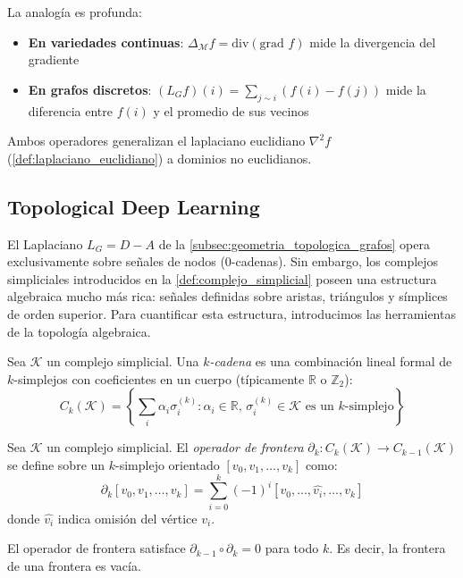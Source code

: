 La analogía es profunda:
\begin{itemize}
	\item \textbf{En variedades continuas}: $\Delta_\mathcal{M} f = \text{div}(\text{grad } f)$ mide la divergencia del gradiente
	\item \textbf{En grafos discretos}: $(L_G f)(i) = \sum_{j \sim i} (f(i) - f(j))$ mide la diferencia entre $f(i)$ y el promedio de sus vecinos
\end{itemize}

Ambos operadores generalizan el laplaciano euclidiano $\nabla^2 f$ (\autoref{def:laplaciano_euclidiano}) a dominios no euclidianos.

\subsection{Topological Deep Learning}\label{subsec:tdl_grafos}

El Laplaciano $L_G = D - A$ de la \autoref{subsec:geometria_topologica_grafos} opera exclusivamente sobre señales de nodos (0-cadenas). Sin embargo, los complejos simpliciales introducidos en la \autoref{def:complejo_simplicial} poseen una estructura algebraica mucho más rica: señales definidas sobre aristas, triángulos y símplices de orden superior. Para cuantificar esta estructura, introducimos las herramientas de la topología algebraica.

\begin{definition}[Cadenas]\label{def:cadenas_gdl}
	Sea $\mathcal{K}$ un complejo simplicial. Una \textit{$k$-cadena} es una combinación lineal formal de $k$-simplejos con coeficientes en un cuerpo (típicamente $\mathbb{R}$ o $\mathbb{Z}_2$):
	\[
		C_k(\mathcal{K}) = \left\{ \sum_{i} \alpha_i \sigma_i^{(k)} : \alpha_i \in \mathbb{R}, \, \sigma_i^{(k)} \in \mathcal{K} \text{ es un } k\text{-simplejo} \right\}
	\]
\end{definition}

\begin{definition}\label{def:operador_frontera_gdl}
	Sea $\mathcal{K}$ un complejo simplicial. El \textit{operador de frontera} $\partial_k: C_k(\mathcal{K}) \to C_{k-1}(\mathcal{K})$ se define sobre un $k$-simplejo orientado $[v_0, v_1, \ldots, v_k]$ como:
	\[
		\partial_k [v_0, v_1, \ldots, v_k] = \sum_{i=0}^{k} (-1)^i [v_0, \ldots, \widehat{v_i}, \ldots, v_k]
	\]
	donde $\widehat{v_i}$ indica omisión del vértice $v_i$.
\end{definition}

\begin{proposition}\label{prop:frontera_cuadrado_cero}
	El operador de frontera satisface $\partial_{k-1} \circ \partial_k = 0$ para todo $k$. Es decir, la frontera de una frontera es vacía.
\end{proposition}

